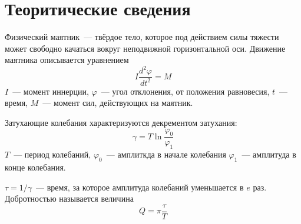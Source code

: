 \section{Теоритические сведения}
Физический маятник~--- твёрдое тело, которое под действием силы тяжести может
свободно качаться вокруг неподвижной горизонтальной оси. Движение маятника
описывается уравнением
\[I\frac{d^2\varphi}{dt^2}=M\]
$I$~--- момент иннерции, $\varphi$~--- угол отклонения, от положения равновесия,
$t$~--- время, $M$~--- момент сил, действующих на маятник.

Затухающие колебания характеризуются декрементом затухания:
\[\gamma = T\ln\frac{\varphi_0}{\varphi_1}\]
$T$~--- период колебаний, $\varphi_0$~--- амплиткда в начале колебания
$\varphi_1$~--- амплитуда в конце колебания.

$\tau=1/\gamma$~--- время, за которое амплитуда колебаний уменьшается в $e$ раз.
Добротностью называется величина
\[Q=\pi\frac{\tau}{T}\]
